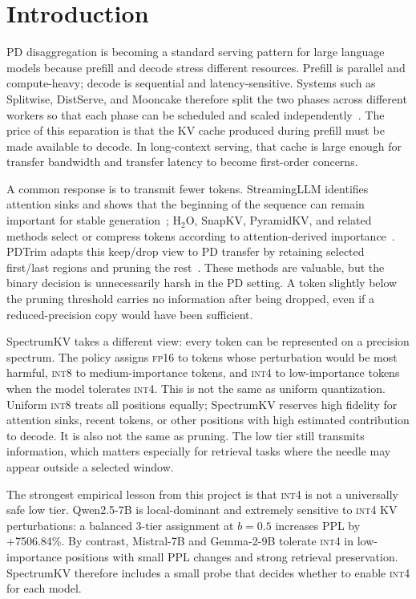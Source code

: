 \documentclass[11pt]{article}
\newcommand{\method}{SpectrumKV}
\newcommand{\budget}{b}
\newcommand{\pct}{\%}
\newcommand{\fp}{\textsc{fp16}}
\newcommand{\intviii}{\textsc{int8}}
\newcommand{\intiv}{\textsc{int4}}
\theoremstyle{plain}
\theoremstyle{definition}
\begin{document}
\section{Introduction}
\label{sec:intro}

PD disaggregation is becoming a standard serving pattern for large language models because prefill and decode stress different resources.  Prefill is parallel and compute-heavy; decode is sequential and latency-sensitive.  Systems such as Splitwise, DistServe, and Mooncake therefore split the two phases across different workers so that each phase can be scheduled and scaled independently~\citep{splitwise,distserve,mooncake}.  The price of this separation is that the KV cache produced during prefill must be made available to decode.  In long-context serving, that cache is large enough for transfer bandwidth and transfer latency to become first-order concerns.

A common response is to transmit fewer tokens.  StreamingLLM identifies attention sinks and shows that the beginning of the sequence can remain important for stable generation~\citep{streamingllm}; H$_2$O, SnapKV, PyramidKV, and related methods select or compress tokens according to attention-derived importance~\citep{h2o,snapkv,pyramidkv,dynamickv}.  PDTrim adapts this keep/drop view to PD transfer by retaining selected first/last regions and pruning the rest~\citep{pdtrim}.  These methods are valuable, but the binary decision is unnecessarily harsh in the PD setting.  A token slightly below the pruning threshold carries no information after being dropped, even if a reduced-precision copy would have been sufficient.

\method{} takes a different view: every token can be represented on a precision spectrum.  The policy assigns \fp{} to tokens whose perturbation would be most harmful, \intviii{} to medium-importance tokens, and \intiv{} to low-importance tokens when the model tolerates \intiv{}.  This is not the same as uniform quantization.  Uniform \intviii{} treats all positions equally; \method{} reserves high fidelity for attention sinks, recent tokens, or other positions with high estimated contribution to decode.  It is also not the same as pruning.  The low tier still transmits information, which matters especially for retrieval tasks where the needle may appear outside a selected window.

The strongest empirical lesson from this project is that \intiv{} is not a universally safe low tier.  Qwen2.5-7B is local-dominant and extremely sensitive to \intiv{} KV perturbations: a balanced 3-tier assignment at $\budget=0.5$ increases PPL by +7506.84\pct{}.  By contrast, Mistral-7B and Gemma-2-9B tolerate \intiv{} in low-importance positions with small PPL changes and strong retrieval preservation.  \method{} therefore includes a small probe that decides whether to enable \intiv{} for each model.
\end{document}
